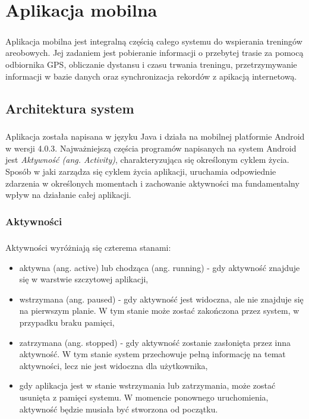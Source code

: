 \chapter{Aplikacja mobilna} %
\label{cha:aplikacja_mobilna}

\paragraph{} %
\label{par:}
Aplikacja mobilna jest integralną częścią całego systemu do wspierania treningów areobowych. Jej zadaniem jest pobieranie informacji o przebytej trasie za pomocą odbiornika GPS, obliczanie dystansu i czasu trwania treningu, przetrzymywanie informacji w bazie danych oraz synchronizacja rekordów z apikacją internetową. 

\section{Architektura system} %
\label{sec:architektura_system}

\paragraph{} %
\label{par:}
Aplikacja została napisana w języku Java i działa na mobilnej platformie Android w wersji 4.0.3. Najważniejszą częścia programów napisanych na system Android jest \textit{Aktywność (ang. Activity)}, charakteryzująca się określonym cyklem życia. Sposób w jaki zarządza się cyklem życia aplikacji, uruchamia odpowiednie zdarzenia w określonych momentach i zachowanie aktywności ma fundamentalny wpływ na działanie całej aplikacji.

\subsection{Aktywności} %
\label{sub:aktywno_ci}

\paragraph{} %
\label{par:}
Aktywności wyróżniają się czterema stanami:
\begin{itemize}
	\item aktywna (ang. active) lub chodząca (ang. running) - gdy aktywność znajduje się w warstwie szczytowej aplikacji,
	\item wstrzymana (ang. paused) - gdy aktywność jest widoczna, ale nie znajduje się na pierwszym planie. W tym stanie może zostać zakończona przez system, w przypadku braku pamięci,
	\item zatrzymana (ang. stopped) - gdy aktywność zostanie zasłonięta przez inna aktywność. W tym stanie system przechowuje pełną informację na temat aktywności, lecz nie jest widoczna dla użytkownika,
	\item gdy aplikacja jest w stanie wstrzymania lub zatrzymania, może zostać usunięta z pamięci systemu. W momencie ponownego uruchomienia, aktywność będzie musiała być stworzona od początku.
\end{itemize}

